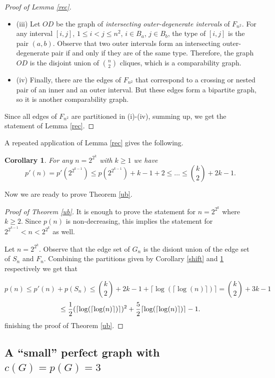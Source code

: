 \documentclass[12pt]{article}
\newtheorem{corollary}[theorem]{Corollary}
\begin{document}
\begin{proof}[Proof of Lemma \ref{rec}]
\begin{itemize}
 \item (iii) Let $OD$ be the graph of {\em intersecting outer-degenerate intervals} of $F_{n^2}$.
   For any interval $[i, j]$, $1\le i<j\le n^2$, $i\in B_a$, $j\in B_b$, the type of $[i,j]$ is the pair $(a,b)$.
   Observe that two outer intervals form an intersecting outer-degenerate pair if and only if they are of the same type.
Therefore, the graph $OD$ is the disjoint union of ${n\choose 2}$ cliques, which is a comparability graph.





\item (iv) Finally, there are the edges of $F_{n^2}$ that correspond to a crossing or nested pair of an inner and an outer interval.
But these edges form a bipartite graph, so it is another comparability graph.

\end{itemize}

Since all edges of $F_{n^2}$ are partitioned in (i)-(iv), summing up, we get the statement of Lemma \ref{rec}.
\end{proof}

A repeated application of Lemma \ref{rec} gives the following.

\begin{corollary}\label{p'}
  For any  $n= 2^{2^k}$ with $k\ge 1$ we have
  $$p'(n)=p'(2^{2^{k-1}})\le p(2^{2^{k-1}})+k-1+2 \le \dots \le {k\choose 2}+2k-1.$$
\end{corollary}

Now we are ready to prove Theorem \ref{ub}.

\begin{proof}[Proof of Theorem \ref{ub}]
It is enough to prove the statement for $n=2^{2^k}$ where $k\ge 2$.
Since $p(n)$ is non-decreasing, this implies the statement for $2^{2^{k-1}}<n < 2^{2^k}$ as well.

Let $n=2^{2^k}$. Observe that the edge set of $G_n$ is the disiont union of the edge set of $S_n$ and $F_n$.
Combining the partitions given by Corollary \ref{shift} and \ref{p'} respectively we get that

$$p(n) \le p'(n)+ p(S_n)\le {k\choose 2}+2k-1+ \lceil\log(\lceil\log(n)\rceil)\rceil={k\choose 2}+3k-1$$
$$\le {1\over 2}(\lceil\log(\lceil\log(n)\rceil)\rceil)^2+{5\over 2}\lceil\log(\lceil\log(n)\rceil)\rceil-1.$$
finishing the proof of Theorem \ref{ub}.
\end{proof}


\subsection{A ``small'' perfect graph with $c(G)=p(G)=3$}
\end{document}
